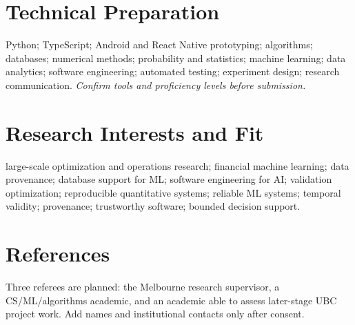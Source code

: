 \documentclass[11pt]{article}
\begin{document}
\section*{Technical Preparation}
Python; TypeScript; Android and React Native prototyping; algorithms; databases; numerical methods; probability and statistics; machine learning; data analytics; software engineering; automated testing; experiment design; research communication. \textit{Confirm tools and proficiency levels before submission.}

\section*{Research Interests and Fit}
large-scale optimization and operations research; financial machine learning; data provenance; database support for ML; software engineering for AI; validation optimization; reproducible quantitative systems; reliable ML systems; temporal validity; provenance; trustworthy software; bounded decision support.

\section*{References}
Three referees are planned: the Melbourne research supervisor, a CS/ML/algorithms academic, and an academic able to assess later-stage UBC project work. Add names and institutional contacts only after consent.
\end{document}
